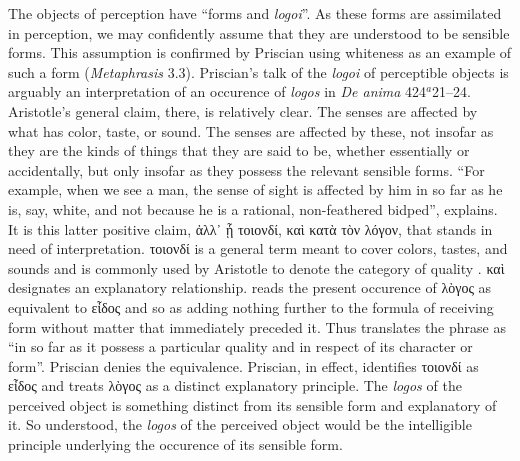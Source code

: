 \documentclass[12pt]{article}
\begin{document}
The objects of perception have ``forms and \emph{logoi}''. As these forms are assimilated in perception, we may confidently assume that they are understood to be sensible forms. This assumption is confirmed by Priscian using whiteness as an example of such a form (\emph{Metaphrasis} 3.3). Priscian's talk of the \emph{logoi} of perceptible objects is arguably an interpretation of an occurence of \emph{logos} in \emph{De anima} 424\( ^{a} \)21--24. Aristotle's general claim, there, is relatively clear. The senses are affected by what has color, taste, or sound. The senses are affected by these, not insofar as they are the kinds of things that they are said to be, whether essentially or accidentally, but only insofar as they possess the relevant sensible forms. ``For example, when we see a man, the sense of sight is affected by him in so far as he is, say, white, and not because he is a rational, non-feathered bidped'', \citet[113]{Hamlyn:2002ys} explains. It is this latter positive claim, {\sbl ἀλλ᾽ ᾗ τοιονδί, καὶ κατὰ τὸν λόγον}, that stands in need of interpretation. {\sbl τοιονδί} is a general term meant to cover colors, tastes, and sounds and is commonly used by Aristotle to denote the category of quality \citep[416]{Hicks:1907uq}. {\sbl καὶ} designates an explanatory relationship. \citet[417]{Hicks:1907uq} reads the present occurence of {\sbl λὸγος} as equivalent to {\sbl εἶδος} and so as adding nothing further to the formula of receiving form without matter that immediately preceded it. Thus \citet[105]{Hicks:1907uq} translates the phrase as ``in so far as it possess a particular quality and in respect of its character or form''. Priscian denies the equivalence. Priscian, in effect, identifies {\sbl τοιονδί} as {\sbl εἶδος} and treats {\sbl λὸγος} as a distinct explanatory principle. The \emph{logos} of the perceived object is something distinct from its sensible form and explanatory of it. So understood, the \emph{logos} of the perceived object would be the intelligible principle underlying the occurence of its sensible form.

\end{document}
